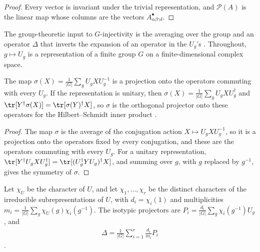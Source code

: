 \begin{proof}\leanok
    Every vector is invariant under the trivial representation, and
    $\mathcal{P}(A)$ is the linear map whose columns are the vectors
    $A^{\bullet}_{\alpha\beta\gamma\delta}$.
\end{proof}

The group-theoretic input to $G$-injectivity is the averaging over the group
and an operator $\Delta$ that inverts the expansion of an operator in the
$U_g$'s \cite[Section~``MPS: the $G$-injective case'']{Schuch2010PEPS}.
Throughout, $g\mapsto U_g$ is a representation of a finite group $G$ on a
finite-dimensional complex space.

\begin{lemma}%
    \label{thm:peps_group_averaging}
    \leanok
    The map $\sigma(X)=\frac{1}{|G|}\sum_g U_gXU_g^{-1}$ is a projection onto
    the operators commuting with every $U_g$. If the representation is unitary,
    then $\sigma(X)=\frac{1}{|G|}\sum_g U_gXU_g^\dagger$ and
    $\tr[Y^\dagger\sigma(X)]=\tr[\sigma(Y)^\dagger X]$, so $\sigma$ is the
    orthogonal projector onto these operators for the Hilbert--Schmidt inner
    product \cite[Section~``MPS: the $G$-injective case'']{Schuch2010PEPS}.
\end{lemma}

\begin{proof}\leanok
    The map $\sigma$ is the average of the conjugation action
    $X\mapsto U_gXU_g^{-1}$, so it is a projection onto the operators fixed
    by every conjugation, and these are the operators commuting with every
    $U_g$. For a unitary representation,
    $\tr[Y^\dagger U_gXU_g^\dagger]=\tr[(U_g^\dagger YU_g)^\dagger X]$, and
    summing over $g$, with $g$ replaced by $g^{-1}$, gives the symmetry of
    $\sigma$.
\end{proof}

\begin{definition}%
    \label{def:peps_delta_operator}
    \leanok
    Let $\chi_U$ be the character of $U$, and let $\chi_1,\dots,\chi_r$ be the
    distinct characters of the irreducible subrepresentations of $U$, with
    $d_i=\chi_i(1)$ and multiplicities
    $m_i=\frac{1}{|G|}\sum_g\chi_U(g)\chi_i(g^{-1})$. The isotypic projectors
    are $P_i=\frac{d_i}{|G|}\sum_g\chi_i(g^{-1})U_g$, and
    \begin{align*}
        \Delta=\frac{1}{|G|}\sum_{i=1}^{r}\frac{d_i}{m_i}P_i
    \end{align*}
    \cite[Section~``MPS: the $G$-injective case'']{Schuch2010PEPS}.
\end{definition}

